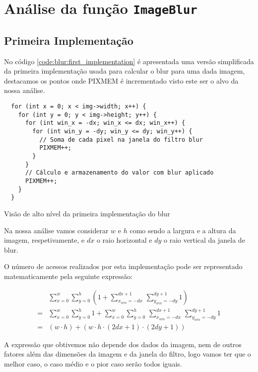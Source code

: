 \cprotect\chapter{Análise da função \Verb|ImageBlur|}

\section{Primeira Implementação}

No código \ref{code:blur:first_implementation} é apresentada uma versão simplificada
da primeira implementação usada para calcular o blur para uma dada imagem,
destacamos os pontos onde PIXMEM é incrementado visto este ser o alvo da nossa
análise.

\begin{listing}[H]
	\centering
	\begin{verbatim}
  for (int x = 0; x < img->width; x++) {
    for (int y = 0; y < img->height; y++) {
      for (int win_x = -dx; win_x <= dx; win_x++) {
        for (int win_y = -dy; win_y <= dy; win_y++) {
          // Soma de cada pixel na janela do filtro blur
          PIXMEM++;
        }
      }
      // Cálculo e armazenamento do valor com blur aplicado
      PIXMEM++;
    }
  }
  \end{verbatim}
	\caption{Visão de alto nível da primeira implementação do blur}
	\label{code:blur:first_implementation}
\end{listing}

Na nossa análise vamos considerar $w$ e $h$ como sendo a largura e a altura da
imagem, respetivamente, e $dx$ o raio horizontal e $dy$ o raio vertical da
janela de blur.

O número de acessos realizados por esta implementação pode ser representado
matematicamente pela seguinte expressão:

\begin{align}
	  & \sum_{x = 0}^{w} \sum_{y = 0}^{h} \left(
	1 +
	\sum_{x_{win} = -dx}^{dx+1} \,
	\sum_{y_{win} = -dy}^{dy+1} 1
	\right)                                                          \\
	= & \sum_{x = 0}^{w} \sum_{y = 0}^{h} 1 +
	\sum_{x = 0}^{w} \sum_{y = 0}^{h} \,
	\sum_{x_{win} = -dx}^{dx + 1} \, \sum_{y_{win} = -dy}^{dy + 1} 1 \\
	= & (w \cdot h) + (w \cdot h \cdot (2dx + 1) \cdot (2dy + 1))
	\label{eq:blur:first_implementation}
\end{align}

A expressão que obtivemos não depende dos dados da imagem, nem de outros
fatores além das dimensões da imagem e da janela do filtro, logo vamos ter que o
melhor caso, o caso médio e o pior caso serão todos iguais.

